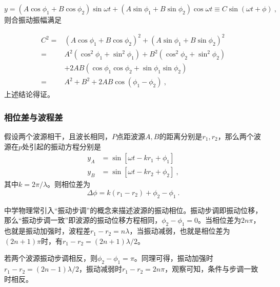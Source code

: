 \begin{equation}
y=\left(A \cos \phi_1+B \cos \phi_2\right) \sin \omega t+\left(A \sin \phi_1+B \sin \phi_2\right) \cos \omega t\equiv C\sin (\omega t+\phi)~,
\end{equation}
则合振动振幅满足

\begin{equation}
\begin{aligned}
C^2
= & \left(A \cos \phi_1+B \cos \phi_2\right)^2+\left(A \sin \phi_1+B \sin \phi_2\right)^2 \\
= & A^2\left(\cos ^2 \phi_1+\sin ^2 \phi_1\right)+B^2\left(\cos ^2 \phi_2+\sin ^2 \phi_2\right) \\
& +2 A B\left(\cos \phi_1 \cos \phi_2+\sin \phi_1 \sin \phi_2\right) \\
= & A^2+B^2+2 A B \cos \left(\phi_1-\phi_2\right)~,
\end{aligned}
\end{equation}
上述结论得证。
\subsubsection{相位差与波程差}
假设两个波源相干，且波长相同，$P$点距波源$A,B$的距离分别是$r_1,r_2$，那么两个波源在$p$处引起的振动方程分别是
\begin{equation}
\begin{aligned}
y_A&=\sin[\omega t-kr_1+\phi_1]\\
y_B&=\sin[\omega t-kr_2+\phi_2]~,
\end{aligned}
\end{equation}
其中$k=2\pi/\lambda$。则相位差为
\begin{equation}
\Delta\phi=k(r_1-r_2)+\phi_2-\phi_1~.
\end{equation}

中学物理常引入“振动步调”的概念来描述波源的振动相位。振动步调即振动位移，那么“振动步调一致”即波源的振动位移方程相同，$\phi_2-\phi_1=0$。当相位差为$2n\pi$，也就是振动加强时，波程差$r_1-r_2=n\lambda$，当振动减弱，也就是相位差为$(2n+1)\pi$时，有$r_1-r_2=(2n+1)\lambda/2$。

若两个波源振动步调相反，则$\phi_2-\phi_1=\pi$。同理可得，振动加强时$r_1-r_2=(2n-1)\lambda/2$，振动减弱时$r_1-r_2=2n\pi$，观察可知，条件与步调一致时相反。


